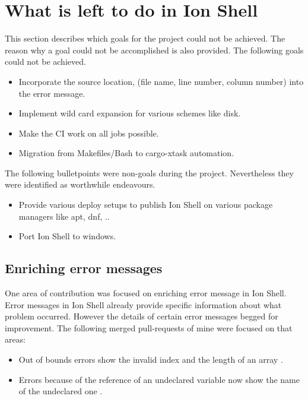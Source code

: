 \clearpage

\section{What is left to do in Ion Shell}

This section describes which goals for the project could not be achieved.
The reason why a goal could not be accomplished is also provided.
The following goals could not be achieved.
\begin{itemize}
	\item Incorporate the source location, (file name, line number, column number) into the error message.
	\item Implement wild card expansion for various schemes like disk.
	\item Make the CI work on all jobs possible.
	\item Migration from Makefiles/Bash to cargo-xtask automation.
\end{itemize}

The following bulletpoints were non-goals during the project.
Nevertheless they were identified as worthwhile endeavours.

\begin{itemize}
	\item Provide various deploy setups to publish Ion Shell on various package managers like apt, dnf, ..
	\item Port Ion Shell to windows.
\end{itemize}

\subsection{Enriching error messages}

One area of contribution was focused on enriching error message in Ion Shell.
Error messages in Ion Shell already provide specific information about what problem occurred.
However the details of certain error messages begged for improvement.
The following merged pull-requests of mine were focused on that areas:

\begin{itemize}
	\item Out of bounds errors show the invalid index and the length of an array \cite{pr_error_message_shows_invalid_range}.
	\item Errors because of the reference of an undeclared variable now show the name of the undeclared one \cite{pr_better_not_found_variable_show}.
\end{itemize}

